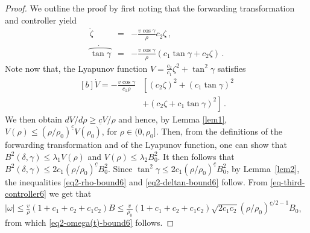 \documentclass[letterpaper, 10 pt, conference]{ieeeconf}  %
\begin{document}
\begin{proof} 
We outline the proof by first noting that the forwarding transformation and controller yield
\begin{eqnarray}
 \dot{\zeta} &=& -\frac{v\cos\gamma}{\rho} c_2\zeta \,,
\\
\dot{\wideparen{\tan\gamma}} &=& -\frac{v\cos\gamma}{\rho}(c_1\tan\gamma+c_2\zeta)\,.
\end{eqnarray}
Note now that, the Lyapunov function $V=\frac{c_2}{c_1}\zeta^2+\tan^2\gamma$ satisfies
\begin{equation}
\begin{aligned}[b]
    \dot V = - \frac{v\cos\gamma}{c_1\rho}&\left[
(c_2\zeta)^2 +(c_1\tan\gamma)^2 \right. \\ &\left. + (c_2\zeta+c_1\tan\gamma)^2
\right]\,.
\end{aligned}
\end{equation}
We then obtain $dV/d\rho \geq \underline c V/\rho$ and hence, by Lemma \ref{lem1},  $V(\rho) \leq (\rho/\rho_0)^{\underline c} V(\rho_0)$, for $\rho\in(0,\rho_0]$. Then, from the definitions of the forwarding transformation and of the Lyapunov function, 
one can show that $B^2(\delta,\gamma) \leq \lambda_1 V(\rho)$ and $V(\rho)\leq \lambda_2 B_0^2$. It then follows that $B^2(\delta,\gamma)\leq 2c_1 (\rho/\rho_0)^{\underline c} B_0^2$. Since $\tan^2\gamma\leq 2c_1 (\rho/\rho_0)^{\underline c}  B_0^2$, by Lemma~\ref{lem2}, the inequalities \eqref{eq2-rho-bound6} and \eqref{eq2-deltan-bound6} follow.  From \eqref{eq-third-controller6} we get that $|\omega| \leq \frac{v}{\rho}(1+c_1+ c_2+c_1 c_2) B\leq \frac{v}{\rho_0}(1+c_1+ c_2+c_1 c_2)\sqrt{2c_1c_2}(\rho/\rho_0)^{\underline c/2 -1} B_0$, from which \eqref{eq2-omega(t)-bound6} follows. 
\end{proof}
\end{document}
